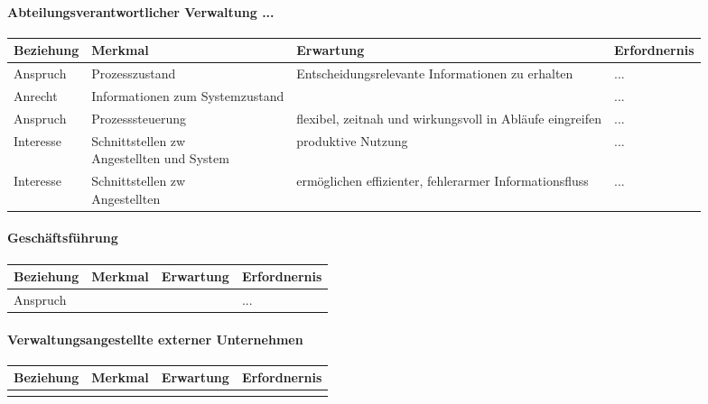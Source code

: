 \documentclass[11pt,oneside,a4paper,notitlepage]{article}
\begin{document}
\paragraph*{Abteilungsverantwortlicher Verwaltung ... }
\begin{center}
\begin{tabular}{| l | l | l | p{5cm} |}
\hline
Beziehung & Merkmal & Erwartung & Erfordnernis\\
\hline
Anspruch & Prozesszustand & Entscheidungsrelevante Informationen zu erhalten & ...\\
Anrecht & Informationen zum Systemzustand &  & ... \\
Anspruch & Prozesssteuerung & flexibel, zeitnah und wirkungsvoll in Abläufe eingreifen & ...\\
Interesse & \parbox[t]{4cm}{Schnittstellen zw\\Angestellten und System} & produktive Nutzung & ...\\
Interesse & \parbox[t]{4cm}{Schnittstellen zw\\Angestellten} & ermöglichen effizienter, fehlerarmer Informationsfluss & ...\\
%
\hline
\end{tabular}
\end{center}
%

%
\paragraph*{Geschäftsführung}
\begin{center}
\begin{tabular}{| p{3cm} | l | l | p{5cm} |}
\hline
Beziehung & Merkmal & Erwartung & Erfordnernis\\
\hline
%
Anspruch &  &  & ... \\
%
\hline
\end{tabular}
\end{center}
%

%
\paragraph*{Verwaltungsangestellte externer Unternehmen}
%
\begin{center}
\begin{tabular}{| l | l | l | p{5cm} |}
\hline
Beziehung & Merkmal & Erwartung & Erfordnernis\\
\hline
 & & &  \\
%
\hline
\end{tabular}
\end{center}
\end{document}
